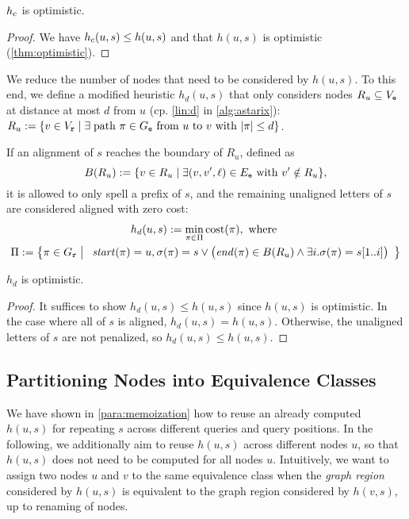 \begin{samepage}
	\begin{theorem} \label{thm:hbar_optimistic}
		$h_{c}$ is optimistic.
	\end{theorem}
	\begin{proof}
		We have $h_c(u,s) \leq h(u,s)$ and that $h(u,s)$ is
		optimistic (\cref{thm:optimistic}).
	\end{proof}
	\end{samepage}

We reduce the number of nodes that need to be considered by $h(u,s)$. To this
end, we define a modified heuristic $h_d(u,s)$ that only considers nodes $R_u
\subseteq V_\texttt{e}$ at distance at most $d$ from $u$ (cp. \cref{lin:d} in
\cref{alg:astarix}):
$
R_u := \{ v \in V_\texttt{r} \mid \exists \; \text{path } \pi \in G_\texttt{e} \text{ from } u \text{ to } v \text{ with } \lvert \pi \rvert \leq d \}
$.

If an alignment of $s$ reaches the boundary of $R_u$, defined as $$B(R_u) := \{v
\in R_u \mid \exists (v,v',\ell) \in E_\texttt{e} \text{ with } v' \notin R_u \},$$ it is
allowed to only spell a prefix of $s$, and the remaining unaligned letters of
$s$ are considered aligned with zero cost:
\begin{gather*}
h_d(u,s) := \min_{\pi \in \Pi} \text{cost}(\pi), \text{ where } \\
\Pi := \left\{ \pi \in G_\texttt{r} \;\middle|\; \begin{array}{c}
\mathit{start}(\pi)=u, 
\sigma(\pi)=s \lor \big(\mathit{end}(\pi)\in B(R_u) \land \exists i. \sigma(\pi)=s[1..i] \big)
\end{array}
\right\}
\end{gather*}

\begin{samepage}
\begin{theorem} \label{thm:hbar_optimistic}
	$h_d$ is optimistic.
\end{theorem}
\begin{proof}
It suffices to show $h_d(u,s) \leq h(u, s)$ since $h(u, s)$ is optimistic. In
the case where all of $s$ is aligned, $h_d(u,s) = h(u, s)$. Otherwise, the
unaligned letters of $s$ are not penalized, so $h_d(u,s) \leq h(u, s)$.
\end{proof}
\end{samepage}


\subsection{Partitioning Nodes into Equivalence Classes} \label{subsec:partition}
We have shown in \cref{para:memoization} how to reuse an already computed
$h(u,s)$ for repeating $s$ across different queries and query positions. In the
following, we additionally aim to reuse $h(u,s)$ across different nodes $u$, so
that $h(u,s)$ does not need to be computed for all nodes $u$. Intuitively, we
want to assign two nodes $u$ and $v$ to the same equivalence class when the
\emph{graph region} considered by $h(u,s)$ is equivalent to the graph region
considered by $h(v,s)$, up to renaming of nodes.

